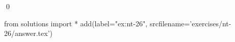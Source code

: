 
\begin{ex} 
  \label{ex:nt-26}
  
  \qed
\end{ex} 
\begin{python0}
from solutions import *
add(label="ex:nt-26",
    srcfilename='exercises/nt-26/answer.tex') 
\end{python0}
